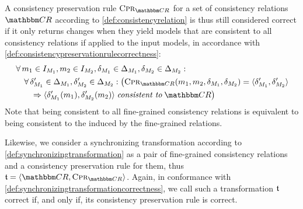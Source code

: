 A consistency preservation rule $\consistencypreservationrule{\consistencyrelationset{CR}}$ for a set of consistency relations $\consistencyrelationset{CR}$ according to \autoref{def:consistencyrelation} is thus still considered correct if it only returns changes when they yield models that are consistent to all consistency relations if applied to the input models, in accordance with \autoref{def:consistencypreservationrulecorrectness}:
\begin{align*}
    &
    \forall \model{m}{1} \in \metamodelinstanceset{M}{1}, \model{m}{2} \in \metamodelinstanceset{M}{2}, \change{\metamodel{M}{1}} \in \changeuniverse{\metamodel{M}{1}}, \change{\metamodel{M}{2}} \in \changeuniverse{\metamodel{M}{2}} : \\
    & \formulaskip
    \forall \change{\metamodel{M}{1}}' \in \changeuniverse{\metamodel{M}{1}}, \change{\metamodel{M}{2}}' \in \changeuniverse{\metamodel{M}{2}} : 
    \big(
        \consistencypreservationrule{\consistencyrelationset{CR}}(\model{m}{1}, \model{m}{2}, \change{\metamodel{M}{1}}, \change{\metamodel{M}{2}}) = \tupled{\change{\metamodel{M}{1}}', \change{\metamodel{M}{2}}'}\\
        & \formulaskip\formulaskip
        \Rightarrow \tupled{\change{\metamodel{M}{1}}'(\model{m}{1}),\change{\metamodel{M}{2}}'(\model{m}{2})} \consistenttomath \consistencyrelationset{CR} 
    \big)
\end{align*}
Note that being consistent to all fine-grained consistency relations is equivalent to being consistent to the \modellevelconsistencyrelation induced by the fine-grained relations.

Likewise, we consider a synchronizing transformation according to \autoref{def:synchronizingtransformation} as a pair of fine-grained consistency relations and a consistency preservation rule for them, thus $\transformation{t} = \tupled{\consistencyrelationset{CR}, \consistencypreservationrule{\consistencyrelationset{CR}}}$.
Again, in conformance with \autoref{def:synchronizingtransformationcorrectness}, we call such a transformation $\transformation{t}$ correct if, and only if, its consistency preservation rule is correct.
